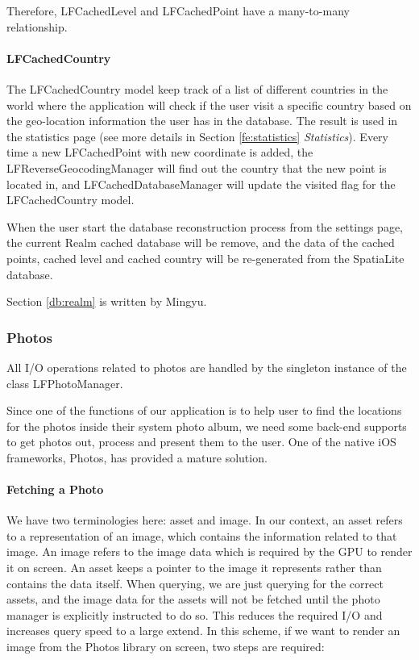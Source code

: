 \documentclass[12pt,a4paper]{article}
\renewcommand\texttt[1]{{\ttfamily\color{textttColor}#1}}
\begin{document}
                    Therefore, \texttt{LFCachedLevel} and \texttt{LFCachedPoint} have a many-to-many relationship.
                    
                \paragraph{LFCachedCountry}
                    The \texttt{LFCachedCountry} model keep track of a list of different countries in the world where the application will check if the user visit a specific country based on the geo-location information the user has in the database. The result is used in the statistics page (see more details in Section \ref{fe:statistics} \textit{Statistics}). Every time a new \texttt{LFCachedPoint} with new coordinate is added, the \texttt{LFReverseGeocodingManager} will find out the country that the new point is located in, and \texttt{LFCachedDatabaseManager} will update the visited flag for the \texttt{LFCachedCountry} model.
                    
                When the user start the database reconstruction process from the settings page, the current Realm cached database will be remove, and the data of the cached points, cached level and cached country will be re-generated from the SpatiaLite database.
                
                \footnotesize
                Section \ref{db:realm} is written by Mingyu.
                \normalsize
            
            \subsubsection{Photos} %
            \label{db:photo}
            
            All I/O operations related to photos are handled by the singleton instance of the class \texttt{LFPhotoManager}.
            
            Since one of the functions of our application is to help user to find the locations for the photos inside their system photo album, we need some back-end supports to get photos out, process and present them to the user. One of the native iOS frameworks, \texttt{Photos}, has provided a mature solution.
            
            \paragraph{Fetching a Photo}
                We have two terminologies here: asset and image. In our context, an asset refers to a representation of an image, which contains the information related to that image. An image refers to the image data which is required by the GPU to render it on screen. An asset keeps a pointer to the image it represents rather than contains the data itself. When querying, we are just querying for the correct assets, and the image data for the assets will not be fetched until the photo manager is explicitly instructed to do so. This reduces the required I/O and increases query speed to a large extend. In this scheme, if we want to render an image from the \texttt{Photos} library on screen, two steps are required:
            
\end{document}
